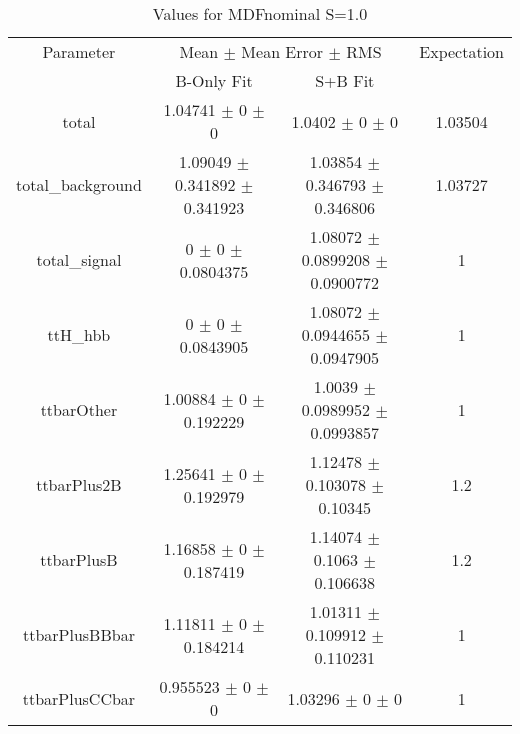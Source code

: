 \begin{table}
\centering
\caption{Values for MDFnominal S=1.0}
\begin{tabular}{cccc}
\toprule
Parameter & \multicolumn{2}{c}{Mean $\pm$ Mean Error $\pm$ RMS} & Expectation\\
 & B-Only Fit & S+B Fit & \\
\midrule
total & \num{1.04741} $\pm$ \num{0} $\pm$ \num{0} & \num{1.0402} $\pm$ \num{0} $\pm$ \num{0} & \num{1.03504}\\
total\_background & \num{1.09049} $\pm$ \num{0.341892} $\pm$ \num{0.341923} & \num{1.03854} $\pm$ \num{0.346793} $\pm$ \num{0.346806} & \num{1.03727}\\
total\_signal & \num{0} $\pm$ \num{0} $\pm$ \num{0.0804375} & \num{1.08072} $\pm$ \num{0.0899208} $\pm$ \num{0.0900772} & \num{1}\\
ttH\_hbb & \num{0} $\pm$ \num{0} $\pm$ \num{0.0843905} & \num{1.08072} $\pm$ \num{0.0944655} $\pm$ \num{0.0947905} & \num{1}\\
ttbarOther & \num{1.00884} $\pm$ \num{0} $\pm$ \num{0.192229} & \num{1.0039} $\pm$ \num{0.0989952} $\pm$ \num{0.0993857} & \num{1}\\
ttbarPlus2B & \num{1.25641} $\pm$ \num{0} $\pm$ \num{0.192979} & \num{1.12478} $\pm$ \num{0.103078} $\pm$ \num{0.10345} & \num{1.2}\\
ttbarPlusB & \num{1.16858} $\pm$ \num{0} $\pm$ \num{0.187419} & \num{1.14074} $\pm$ \num{0.1063} $\pm$ \num{0.106638} & \num{1.2}\\
ttbarPlusBBbar & \num{1.11811} $\pm$ \num{0} $\pm$ \num{0.184214} & \num{1.01311} $\pm$ \num{0.109912} $\pm$ \num{0.110231} & \num{1}\\
ttbarPlusCCbar & \num{0.955523} $\pm$ \num{0} $\pm$ \num{0} & \num{1.03296} $\pm$ \num{0} $\pm$ \num{0} & \num{1}\\
\bottomrule
\end{tabular}
\end{table}